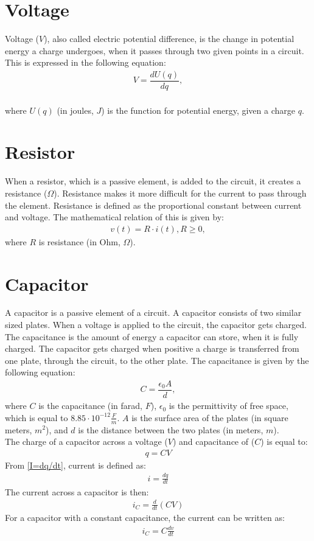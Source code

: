 \section{Voltage}
Voltage ($V$), also called electric potential difference, is the change in potential energy a charge undergoes, when it passes through two given points in a circuit. This is expressed in the following equation:
\begin{align}
	V=\dfrac{dU(q)}{dq},
\end{align}
\\
where $U(q)$ (in joules, $J$) is the function for potential energy, given a charge $q$.

\section{Resistor}
When a resistor, which is a passive element, is added to the circuit, it creates a resistance ($\Omega$). Resistance makes it more difficult for the current to pass through the element. Resistance is defined as the proportional constant between current and voltage. The mathematical relation of this is given by:
\begin{align} 
\label{Ohm}
v(t)=R\cdot i(t),  R\geq0,
\end{align}
where $R$ is resistance (in Ohm, $\Omega$).


\section{Capacitor}
A capacitor is a passive element of a circuit. A capacitor consists of two similar sized plates. When a voltage is applied to the circuit, the capacitor gets charged. The capacitance is the amount of energy a capacitor can store, when it is fully charged. The capacitor gets charged when positive a charge is transferred from one plate, through the circuit, to the other plate. The capacitance is given by the following equation:
\begin{align*}
C=\dfrac{\epsilon_{0}A}{d},
\end{align*}
where $C$ is the capacitance (in farad, $F$), $\epsilon_{0}$ is the permittivity of free space, which is equal to $8.85 \cdot 10^{-12}                                                 \frac{F}{m}$. $A$ is the surface area of the plates (in square meters, $m^{2}$), and $d$ is the distance between the two plates (in meters, $m$).
\\
The charge of a capacitor across a voltage ($V$) and capacitance of ($C$) is equal to:
\begin{align}
\label{QCV}
q = CV	
\end{align}
From \eqref{I=dq/dt}, current is defined as:
\begin{align*}
	i = \frac{dq}{dt}
\end{align*}
The current across a capacitor is then:
\begin{align*}
	i_C = \frac{d}{dt}(CV)
\end{align*}
For a capacitor with a constant capacitance, the current can be written as:
\begin{align}
	i_C = C\frac{dv}{dt}\label{iC}
\end{align}


